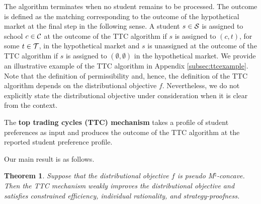 \documentclass[12pt]{amsart}
\newtheorem{theorem}{Theorem}
\theoremstyle{remark}
\newcommand{\mby}[1]{{\color{blue} MBY: #1 }}
\begin{document}
The algorithm terminates when no student remains to be processed. The outcome is defined as the matching corresponding to
the outcome of the hypothetical market at the final step in the following sense. A student $s\in \mathcal{S}$ is assigned to school $c\in \mathcal{C}$
at the outcome of the TTC algorithm if $s$ is assigned to $(c,t)$, for some $t\in \mathcal{T}$, in the hypothetical market and $s$ is unassigned
at the outcome of the TTC algorithm if $s$ is assigned to $(\emptyset,\emptyset)$ in the hypothetical market. We provide an illustrative
example of the TTC algorithm in Appendix \ref{subsec:ttcexample}. Note that the definition of permissibility and, hence, the definition of
the TTC algorithm depends on the distributional objective $f$. Nevertheless, we do not explicitly state the distributional objective under
consideration when it is clear from the context.

The \textbf{top trading cycles (TTC) mechanism} takes a profile of student preferences as input and produces the outcome of the TTC algorithm
at the reported student preference profile.

Our main result is as follows.

\begin{theorem}\label{thm:ttc}
Suppose that the distributional objective $f$ is pseudo M$^{\natural}$-concave. Then the TTC mechanism weakly improves the distributional objective and satisfies constrained efficiency, individual rationality, and strategy-proofness.%
\end{theorem}

\end{document}
